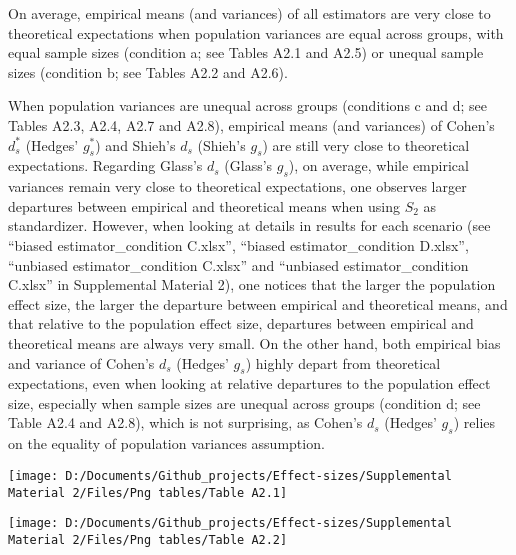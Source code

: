 \documentclass[
  english,
  man]{apa6}
\begin{document}
On average, empirical means (and variances) of all estimators are very close to theoretical expectations when population variances are equal across groups, with equal sample sizes (condition a; see Tables A2.1 and A2.5) or unequal sample sizes (condition b; see Tables A2.2 and A2.6).

When population variances are unequal across groups (conditions c and d; see Tables A2.3, A2.4, A2.7 and A2.8), empirical means (and variances) of Cohen's \(d^*_s\) (Hedges' \(g^*_s\)) and Shieh's \(d_s\) (Shieh's \(g_s\)) are still very close to theoretical expectations. Regarding Glass's \(d_s\) (Glass's \(g_s\)), on average, while empirical variances remain very close to theoretical expectations, one observes larger departures between empirical and theoretical means when using \(S_2\) as standardizer. However, when looking at details in results for each scenario (see \enquote{biased estimator\_condition C.xlsx}, \enquote{biased estimator\_condition D.xlsx}, \enquote{unbiased estimator\_condition C.xlsx} and \enquote{unbiased estimator\_condition C.xlsx} in Supplemental Material 2), one notices that the larger the population effect size, the larger the departure between empirical and theoretical means, and that relative to the population effect size, departures between empirical and theoretical means are always very small. On the other hand, both empirical bias and variance of Cohen's \(d_s\) (Hedges' \(g_s\)) highly depart from theoretical expectations, even when looking at relative departures to the population effect size, especially when sample sizes are unequal across groups (condition d; see Table A2.4 and A2.8), which is not surprising, as Cohen's \(d_s\) (Hedges' \(g_s\)) relies on the equality of population variances assumption.

\begin{sidewaysfigure}

{\centering \texttt{[image: D:/Documents/Github\_projects/Effect-sizes/Supplemental Material 2/Files/Png tables/Table A2.1]} 

}

\end{sidewaysfigure}

\begin{sidewaysfigure}

{\centering \texttt{[image: D:/Documents/Github\_projects/Effect-sizes/Supplemental Material 2/Files/Png tables/Table A2.2]} 

}

\end{sidewaysfigure}
\end{document}
